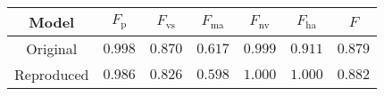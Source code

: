 \begin{tabular}{c|cccccc}
    \textbf{Model} & $F_{\textrm{p}}$ & $F_{\textrm{vs}}$ & $F_{\textrm{ma}}$ & $F_{\textrm{nv}}$ & $F_{\textrm{ha}}$ & $F$ \\\hline
    Original       & $\mathbf{0.998}$ & $\mathbf{0.870}$  & $\mathbf{0.617}$  & $0.999$           & $0.911$           & $0.879$          \\
    Reproduced     & $0.986$          & $0.826$           & $0.598$           & $\mathbf{1.000}$  & $\mathbf{1.000}$  & $\mathbf{0.882}$ \\
\end{tabular}
